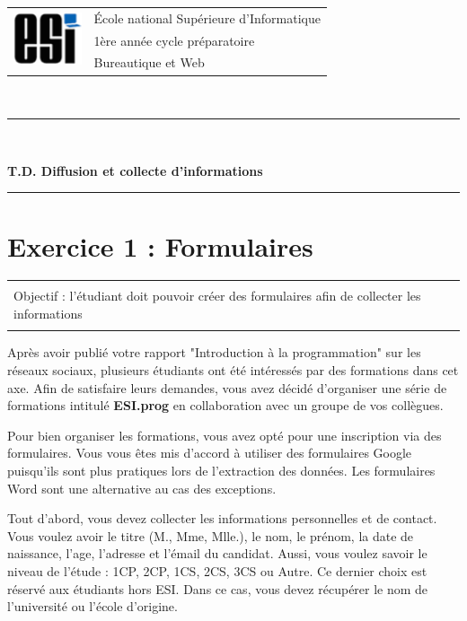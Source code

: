 \documentclass[11pt, a4paper]{article}
\begin{document}

\noindent
\begin{tabular}{ll}
\multirow{3}{*}{\includegraphics[width=2cm]{../esi-logo.png}} & \'Ecole national Supérieure d'Informatique\\
& 1ère année cycle préparatoire\\
& Bureautique et Web
\end{tabular}\\[.25cm]
\noindent\rule{\textwidth}{1pt}\\%
\begin{center}
{\LARGE \textbf{T.D. Diffusion et collecte d'informations}}
\end{center}
\noindent\rule{\textwidth}{1pt}

\section*{Exercice 1 : Formulaires}

\vspace{-12pt}
\begin{tabular}{|p{\textwidth}|}
	\hline\\
	Objectif : l'étudiant doit pouvoir créer des formulaires afin de collecter les informations   \\\\
	\hline
\end{tabular}

Après avoir publié votre rapport "Introduction à la programmation" sur les réseaux sociaux, plusieurs étudiants ont été intéressés par des formations dans cet axe. 
Afin de satisfaire leurs demandes, vous avez décidé d'organiser une série de formations intitulé \textbf{ESI.prog} en collaboration avec un groupe de vos collègues.

Pour bien organiser les formations, vous avez opté pour une inscription via des formulaires. 
Vous vous êtes mis d'accord à utiliser des formulaires Google puisqu'ils sont plus pratiques lors de l'extraction des données. 
Les formulaires Word sont une alternative au cas des exceptions. 

Tout d'abord, vous devez collecter les informations personnelles et de contact. 
Vous voulez avoir le titre (M., Mme, Mlle.), le nom, le prénom, la date de naissance, l'age, l'adresse et l'émail du candidat. 
Aussi, vous voulez savoir le niveau de l'étude : 1CP, 2CP, 1CS, 2CS, 3CS ou Autre.
Ce dernier choix est réservé aux étudiants hors ESI. 
Dans ce cas, vous devez récupérer le nom de l'université ou l'école d'origine. 
\end{document}
